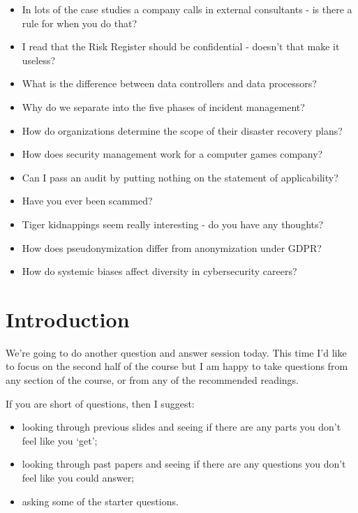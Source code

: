 \documentclass[12pt]{article}
\begin{document}
\begin{itemize}
  \item In lots of the case studies a company calls in external consultants - is there a rule for when you do that?
  \item I read that the Risk Register should be confidential - doesn't that make it useless?
  \item What is the difference between data controllers and data processors?
  \item Why do we separate into the five phases of incident management?
  \item How do organizations determine the scope of their disaster recovery plans?
  \item How does security management work for a computer games company?
  \item Can I pass an audit by putting nothing on the statement of applicability?
  \item Have you ever been scammed?
  \item Tiger kidnappings seem really interesting - do you have any thoughts?
  \item How does pseudonymization differ from anonymization under GDPR?
  \item How do systemic biases affect diversity in cybersecurity careers?
\end{itemize}


%
%



\maketitle

\section*{Introduction}
We're going to do another question and answer session today. This time I'd like to focus on the second half of the course but I am happy to take questions from any section of the course, or from any of the recommended readings. 

If you are short of questions, then I suggest: 

\begin{itemize} 
\item looking through previous slides and seeing if there are any parts you don't feel like you `get';
\item looking through past papers and seeing if there are any questions you don't feel like you could answer;
\item asking some of the starter questions.
\end{itemize} 
\end{document}
